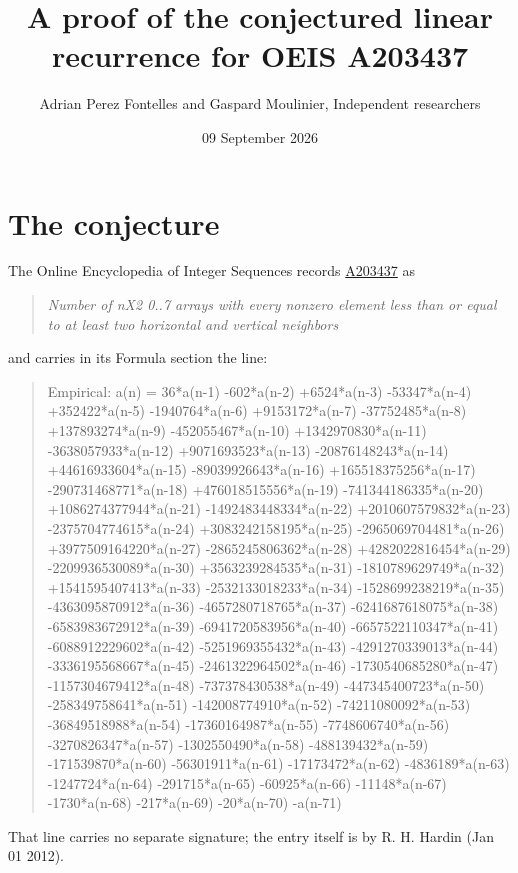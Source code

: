 \documentclass[11pt]{article}
\title{A proof of the conjectured linear recurrence for OEIS A203437}
\author{Adrian Perez Fontelles and Gaspard Moulinier, Independent researchers}
\date{09 September 2026}
\theoremstyle{definition}
\begin{document}
\maketitle
\section{The conjecture}

The Online Encyclopedia of Integer Sequences records \href{https://oeis.org/A203437}{A203437} as

\begin{quote}\itshape Number of nX2 0..7 arrays with every nonzero element less than or equal to at least two horizontal and vertical neighbors\end{quote}

and carries in its Formula section the line:

\begin{quote}\ttfamily Empirical: a(n) = 36*a(n-1) -602*a(n-2) +6524*a(n-3) -53347*a(n-4) +352422*a(n-5) -1940764*a(n-6) +9153172*a(n-7) -37752485*a(n-8) +137893274*a(n-9) -452055467*a(n-10) +1342970830*a(n-11) -3638057933*a(n-12) +9071693523*a(n-13) -20876148243*a(n-14) +44616933604*a(n-15) -89039926643*a(n-16) +165518375256*a(n-17) -290731468771*a(n-18) +476018515556*a(n-19) -741344186335*a(n-20) +1086274377944*a(n-21) -1492483448334*a(n-22) +2010607579832*a(n-23) -2375704774615*a(n-24) +3083242158195*a(n-25) -2965069704481*a(n-26) +3977509164220*a(n-27) -2865245806362*a(n-28) +4282022816454*a(n-29) -2209936530089*a(n-30) +3563239284535*a(n-31) -1810789629749*a(n-32) +1541595407413*a(n-33) -2532133018233*a(n-34) -1528699238219*a(n-35) -4363095870912*a(n-36) -4657280718765*a(n-37) -6241687618075*a(n-38) -6583983672912*a(n-39) -6941720583956*a(n-40) -6657522110347*a(n-41) -6088912229602*a(n-42) -5251969355432*a(n-43) -4291270339013*a(n-44) -3336195568667*a(n-45) -2461322964502*a(n-46) -1730540685280*a(n-47) -1157304679412*a(n-48) -737378430538*a(n-49) -447345400723*a(n-50) -258349758641*a(n-51) -142008774910*a(n-52) -74211080092*a(n-53) -36849518988*a(n-54) -17360164987*a(n-55) -7748606740*a(n-56) -3270826347*a(n-57) -1302550490*a(n-58) -488139432*a(n-59) -171539870*a(n-60) -56301911*a(n-61) -17173472*a(n-62) -4836189*a(n-63) -1247724*a(n-64) -291715*a(n-65) -60925*a(n-66) -11148*a(n-67) -1730*a(n-68) -217*a(n-69) -20*a(n-70) -a(n-71)\end{quote}

That line carries no separate signature; the entry itself is by R. H. Hardin (Jan 01 2012).
\end{document}
